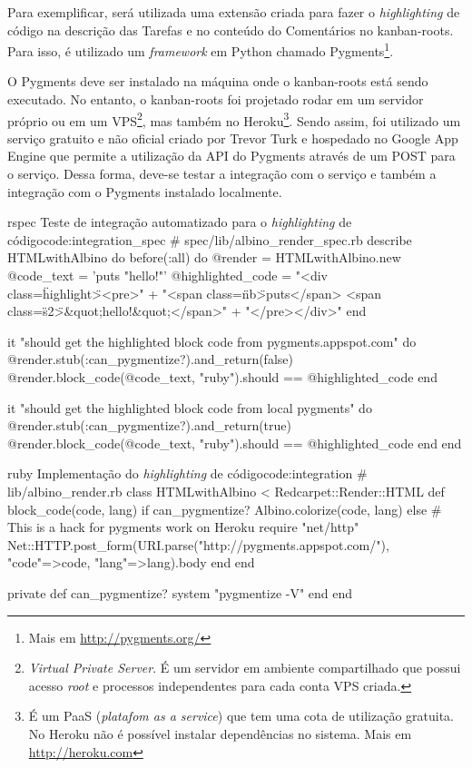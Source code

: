 Para exemplificar, será utilizada uma extensão criada para fazer o \textit{highlighting} de código na descrição das Tarefas e no conteúdo do Comentários no kanban-roots. Para isso, é utilizado um \textit{framework} em Python chamado Pygments\footnote{ Mais em \url{http://pygments.org/}}.

O Pygments deve ser instalado na máquina onde o kanban-roots está sendo executado. No entanto, o kanban-roots foi projetado rodar em um servidor próprio ou em um VPS\footnote{ \textit{Virtual Private Server}. É um servidor em ambiente compartilhado que possui acesso \textit{root} e processos independentes para cada conta VPS criada.}, mas também no Heroku\footnote{ É um PaaS (\textit{platafom as a service}) que tem uma cota de utilização gratuita. No Heroku não é possível instalar dependências no sistema. Mais em \url{http://heroku.com}}. Sendo assim, foi utilizado um serviço gratuito e não oficial criado por Trevor Turk e hospedado no Google App Engine que permite a utilização da API do Pygments através de um POST para o serviço. Dessa forma, deve-se testar a integração com o serviço e também a integração com o Pygments instalado localmente.

\begin{mycode}{rspec}%
{Teste de integração automatizado para o \textit{highlighting} de código}{code:integration_spec}
# spec/lib/albino_render_spec.rb
describe HTMLwithAlbino do
  before(:all) do
    @render = HTMLwithAlbino.new
    @code_text = 'puts "hello!"'
    @highlighted_code =
      "<div class=\"highlight\"><pre>" +
        "<span class=\"nb\">puts</span> <span class=\"s2\">&quot;hello!&quot;</span>\n" +
      "</pre>\n</div>\n"
  end

  it "should get the highlighted block code from pygments.appspot.com" do
    @render.stub(:can_pygmentize?).and_return(false)
    @render.block_code(@code_text, "ruby").should == @highlighted_code
  end

  it "should get the highlighted block code from local pygments" do
    @render.stub(:can_pygmentize?).and_return(true)
    @render.block_code(@code_text, "ruby").should == @highlighted_code
  end
end
\end{mycode}

\begin{mycode}{ruby}%
{Implementação do \textit{highlighting} de código}{code:integration}
# lib/albino_render.rb
class HTMLwithAlbino < Redcarpet::Render::HTML
  def block_code(code, lang)
    if can_pygmentize?
      Albino.colorize(code, lang)
    else
      # This is a hack for pygments work on Heroku
      require "net/http"
      Net::HTTP.post_form(URI.parse("http://pygments.appspot.com/"),
                          {"code"=>code, "lang"=>lang}).body
    end
  end

  private
  def can_pygmentize?
    system "pygmentize -V"
  end
end
\end{mycode}

